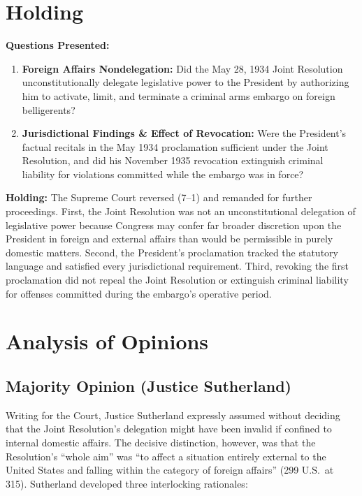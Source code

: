 \documentclass[12pt]{article}
\begin{document}
\section{Holding}
\textbf{Questions Presented:}

\begin{enumerate}
  \item \textbf{Foreign Affairs Nondelegation:} Did the May 28, 1934 Joint Resolution unconstitutionally delegate legislative power to the President by authorizing him to activate, limit, and terminate a criminal arms embargo on foreign belligerents?
  \item \textbf{Jurisdictional Findings \& Effect of Revocation:} Were the President's factual recitals in the May 1934 proclamation sufficient under the Joint Resolution, and did his November 1935 revocation extinguish criminal liability for violations committed while the embargo was in force?
\end{enumerate}

\textbf{Holding:} The Supreme Court reversed (7--1) and remanded for further proceedings. First, the Joint Resolution was not an unconstitutional delegation of legislative power because Congress may confer far broader discretion upon the President in foreign and external affairs than would be permissible in purely domestic matters. Second, the President's proclamation tracked the statutory language and satisfied every jurisdictional requirement. Third, revoking the first proclamation did not repeal the Joint Resolution or extinguish criminal liability for offenses committed during the embargo's operative period.

\section{Analysis of Opinions}
\subsection{Majority Opinion (Justice Sutherland)}

Writing for the Court, Justice Sutherland expressly assumed without deciding that the Joint Resolution's delegation might have been invalid if confined to internal domestic affairs. The decisive distinction, however, was that the Resolution's ``whole aim'' was ``to affect a situation entirely external to the United States and falling within the category of foreign affairs'' (299 U.S.\ at 315). Sutherland developed three interlocking rationales:
\end{document}
